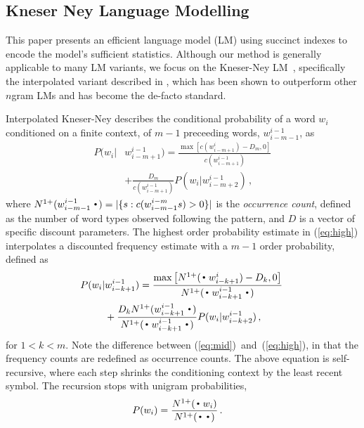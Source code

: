 
\subsection{Kneser Ney Language Modelling}
\label{sec-lm}


This paper presents an efficient \ngram language model (LM) using succinct indexes to encode the model's sufficient statistics. %
Although our method is generally applicable to many LM variants, we focus on the Kneser-Ney LM~\cite{kneser1995improved}, specifically the interpolated variant described in , which has been shown to outperform other $n$gram LMs and has become the de-facto standard.

Interpolated Kneser-Ney describes the conditional probability of a word $w_i$ conditioned on a finite context, of $m-1$ preceeding words, $w_{i-m-1}^{i-1}$, as 
\begin{align}
\! P(w_i |& w_{i-m+1}^{i-1})
 = \frac{\max\left[c(w^{i}_{i-m+1}) - D_m,0\right]}{c(w^{i-1}_{i-m+1})} \nonumber \\
& +\frac{D_m }{c(w^{i-1}_{i-m+1})}  P(w_i | w_{i-m+2}^{i-1}) \, , \label{eq:high}
\end{align}
where \mbox{$\nlplus{w^{i-1}_{i-m-1}\Bigcdot} = |\{s: c(w^{i-m}_{i-m-1}s)>0\}|$} is the \emph{occurrence count}, defined as the number of word types observed following the pattern, and $D$ is a vector of \ngram specific discount parameters.
The highest order probability estimate in (\ref{eq:high}) interpolates a discounted frequency estimate with a $m-1$ order probability, defined as 
\begin{align}
\! P(w_i |& w_{i-k+1}^{i-1})
 = \frac{\max\left[\nlplus{\Bigcdot w_{i-k+1}^{i}} - D_k,0\right]}{\nlplus{\Bigcdot w_{i-k+1}^{i-1} \Bigcdot}} \nonumber \\
&+ \frac{D_k \nlplus{w_{i-k+1}^{i-1}\Bigcdot}}{\nlplus{\Bigcdot w_{i-k+1}^{i-1} \Bigcdot}} P(w_i | w_{i-k+2}^{i-1}) \, , \! \label{eq:mid}
\end{align}
for $1<k<m$. 
Note the difference between (\ref{eq:mid})~and~(\ref{eq:high}), in that the frequency counts are redefined as occurrence counts. 
The above equation is self-recursive, where each step shrinks the conditioning context by the least recent symbol. 
The recursion stops with unigram probabilities,
\begin{align*}
P(w_i) &= \frac{\nlplus{\Bigcdot w_i}}{\nlplus{\Bigcdot\Bigcdot}} \, .
\end{align*}

